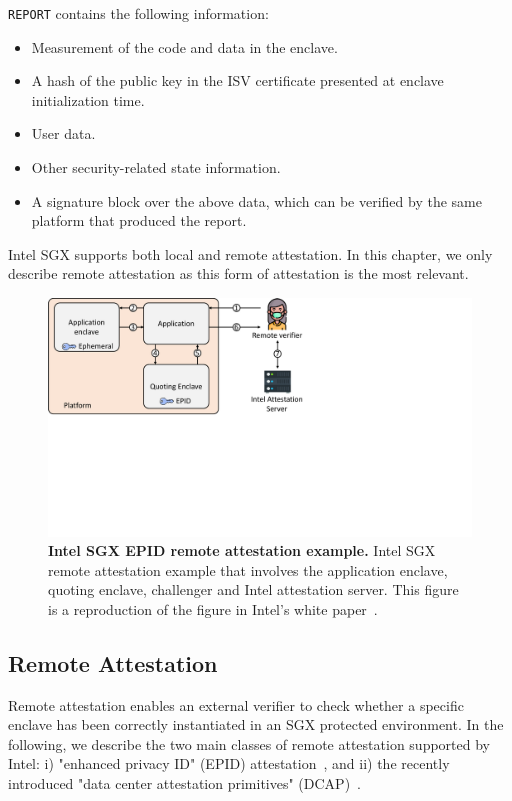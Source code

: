 \texttt{REPORT} contains the following information:

\begin{itemize}
  \item Measurement of the code and data in the enclave.
  \item A hash of the public key in the ISV certificate presented at enclave initialization time.
  \item User data.
  \item Other security-related state information.
  \item A signature block over the above data, which can be verified by the same platform that produced the report.
\end{itemize}

Intel SGX supports both local and remote attestation. In this chapter, we only describe remote attestation as this form of attestation is the most relevant.

\begin{figure}[t]
  \centering
    \includegraphics[trim={0 9cm 12cm 0},clip,width=0.9\linewidth]{chapters/background/figures/remote_attestation.pdf}
    \caption[Intel SGX EPID remote attestation example]{\textbf{Intel SGX EPID remote attestation example.} Intel SGX remote attestation example that involves the application enclave, quoting enclave, challenger and Intel attestation server. This figure is a reproduction of the figure in Intel's white paper~\cite{attestation_primitive_all}.}
    \label{fig:ra_bg}
\end{figure}

\subsection{Remote Attestation}
\label{ch:background:SGX:remote}

Remote attestation enables an external verifier to check whether a specific enclave has been correctly instantiated in an SGX protected environment. In the following, we describe the two main classes of remote attestation supported by Intel: i) "enhanced privacy ID" (EPID) attestation~\cite{epid_attestation}, and ii) the recently introduced "data center attestation primitives" (DCAP)~\cite{DCAP}. 

